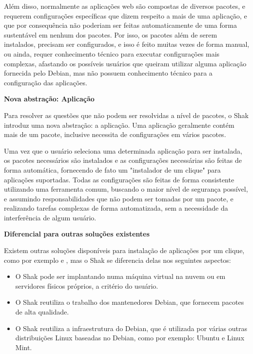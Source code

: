 Além disso, normalmente as aplicações web são compostas de diversos pacotes, e
requerem configurações específicas que dizem respeito a mais de uma aplicação,
e que por consequência não poderiam ser feitas automaticamente de uma forma sustentável em nenhum dos pacotes. Por isso, os pacotes além de serem instalados, precisam ser configurados,
e isso é feito muitas vezes de forma manual, ou ainda, requer conhecimento técnico
para executar configurações mais complexas, afastando os possíveis usuários
que queiram utilizar alguma aplicação fornecida pelo Debian, mas não possuem
conhecimento técnico para a configuração das aplicações.

\textbf{Nova abstração: Aplicação}

Para resolver as questões que não podem ser resolvidas a nível de pacotes, o
Shak introduz uma nova abstração: a aplicação. Uma aplicação geralmente
contém mais de um pacote, inclusive necessita de configurações em vários pacotes.

Uma vez que o usuário seleciona uma determinada aplicação para
ser instalada, os pacotes necessários são instalados e as configurações
necessárias são feitas de forma automática, fornecendo de fato um "instalador
de um clique" para aplicações suportadas. Todas as configurações são feitas de
forma consistente utilizando uma ferramenta comum, buscando o maior nível de
segurança possível, e assumindo responsabilidades que não podem ser tomadas por
um pacote, e realizando tarefas complexas de forma automatizada, sem a necessidade
da interferência de algum usuário.

\textbf{Diferencial para outras soluções existentes}

Existem outras soluções disponíveis para instalação de aplicações por um clique,
como por exemplo \cite{bitnami} e \cite{sandstormio}, mas o Shak se
diferencia delas nos seguintes aspectos:

\begin{itemize}
  \item O Shak pode ser implantando numa máquina virtual na nuvem ou em servidores físicos
    próprios, a critério do usuário.

  \item O Shak reutiliza o trabalho dos mantenedores Debian, que fornecem pacotes
    de alta qualidade.

  \item O Shak reutiliza a infraestrutura do Debian, que é utilizada por várias
outras distribuições Linux baseadas no Debian, como por exemplo: Ubuntu e Linux Mint.

\end{itemize}

